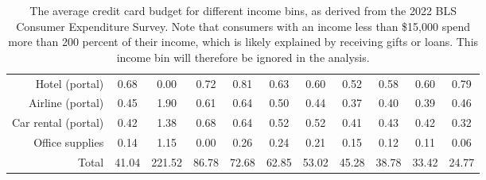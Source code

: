 \begin{table}[t!bh]
\begin{tabular}{ r c c c c c c c c c c}
        Hotel (portal) & 0.68 &	0.00 &	0.72 &	0.81 &	0.63 &	0.60 &	0.52 &	0.58 &	0.60 &	0.79 \\
        Airline (portal) & 0.45 &	1.90 &	0.61 &	0.64 &	0.50 &	0.44 &	0.37 &	0.40 &	0.39 &	0.46 \\
        Car rental (portal) & 0.42 &	1.38 &	0.68 &	0.64 &	0.52 &	0.52 &	0.41 &	0.43 &	0.42 &	0.32 \\
        Office supplies &  0.14 &	1.15 &	0.00 &	0.26 &	0.24 &	0.21 &	0.15 &	0.12 &	0.11 &	0.06 \\
        \hline
        \hline
        Total & 41.04 &	221.52 & 86.78 & 72.68 & 62.85 & 53.02 & 45.28 & 38.78 & 33.42 & 24.77 \\
    \end{tabular}
    \caption{The average credit card budget for different income bins, as derived from the 2022 BLS Consumer Expenditure Survey. Note that consumers with an income less than \$15,000 spend more than 200 percent of their income, which is likely explained by receiving gifts or loans. This income bin will therefore be ignored in the analysis.}
    \label{tab:BudgetIncome}
\end{table}

